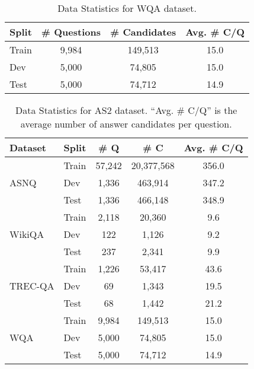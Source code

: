 \begin{table}[h!]
\centering
\small
\begin{tabular}{lccc}
\hline
    \textbf{Split} & \textbf{\# Questions} & \textbf{\# Candidates} & \textbf{Avg. \# C/Q} \\
  \hline
    Train   & 9,984     & 149,513     & 15.0 \\
    Dev     & 5,000     & 74,805      & 15.0 \\
    Test    & 5,000     & 74,712      & 14.9 \\
    \hline
\end{tabular}
\caption{Data Statistics for WQA dataset.}
\vspace{1em}
\label{tab:wqa}
\end{table}

\fi

\begin{table}[ht!]
\centering
\small
\begin{tabular}{llccc}
\hline
    \textbf{Dataset} & \textbf{Split} & \textbf{\# Q} & \textbf{\# C} & \textbf{Avg. \# C/Q} \\
    
    \hline
    \multirow{3}{*}{ASNQ}       & Train   & 57,242 & 20,377,568 & 356.0 \\
                                & Dev     & 1,336  & 463,914    & 347.2 \\
                                & Test    & 1,336  & 466,148    & 348.9 \\

    \hline
    \multirow{3}{*}{WikiQA}     & Train & 2,118 & 20,360  & 9.6 \\
                                & Dev     & 122   & 1,126   & 9.2 \\
                                & Test    & 237   & 2,341   & 9.9 \\
    \hline

    \multirow{3}{*}{TREC-QA}    & Train   & 1,226 & 53,417     & 43.6 \\
                                & Dev     & 69    & 1,343      & 19.5 \\
                                & Test    & 68    & 1,442      & 21.2 \\

    \hline
    \multirow{3}{*}{WQA}        & Train   & 9,984     & 149,513     & 15.0 \\
                                & Dev     & 5,000     & 74,805      & 15.0 \\
                                & Test    & 5,000     & 74,712      & 14.9 \\
    \hline

\end{tabular}
\caption{Data Statistics for AS2 dataset. ``Avg. \# C/Q'' is the average number of answer candidates per question.}
\label{tab:as2_datasets}
\end{table}






